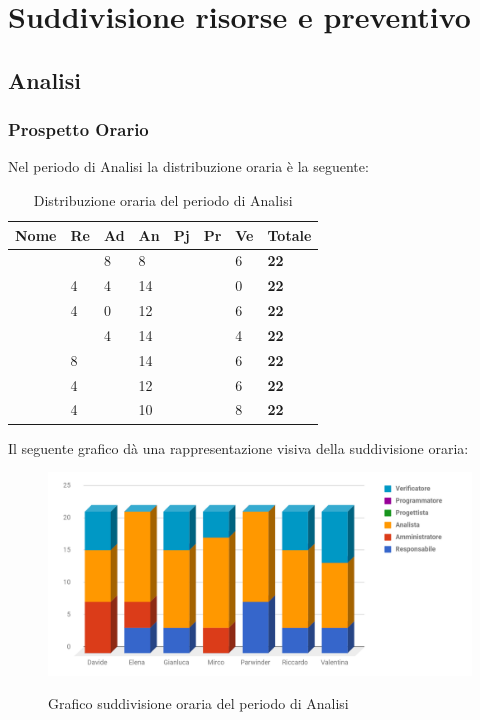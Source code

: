 \documentclass[PianoDiProgetto.tex]{subfiles}
\begin{document}
\chapter{Suddivisione risorse e preventivo}
\section{Analisi}
\subsection{Prospetto Orario}
Nel periodo di Analisi la distribuzione oraria è la seguente:
\begin{center}
\begin{table}[htbp]
	\centering
	\renewcommand\arraystretch{1.5}
	\begin{tabularx}{\textwidth}{p{4cm}|p{1cm}|p{1cm}|p{1cm}|p{1cm}|p{1cm}|p{1cm}|p{2cm}}
		\hline
		\textbf{Nome} & \textbf{Re} & \textbf{Ad} & \textbf{An} & \textbf{Pj} & \textbf{Pr} & \textbf{Ve} & \textbf{Totale} \\
		\hline
		\Davide & \ & 8 & 8 & \ & \ & 6 & \textbf{22} \\
		\hline
		\Elena & 4 & 4 & 14 & \ & \ & 0 & \textbf{22} \\
		\hline
		\Gianluca & 4 & 0 & 12 & \ & \ & 6 & \textbf{22} \\
		\hline
		\Mirco & \ & 4 & 14 & \ & \ & 4 & \textbf{22} \\
		\hline
		\Parwinder & 8 & \ & 14 & \ & \ & 6 & \textbf{22} \\
		\hline
		\Riccardo & 4 & \ & 12 & \ & \ & 6 & \textbf{22} \\
		\hline
		\Valentina & 4 & \ & 10 & \ & \ & 8 & \textbf{22} \\
		\hline
	\end{tabularx}
	\caption{Distribuzione oraria del periodo di Analisi}
	\label{my-label}
\end{table} 
\newpage	
\end{center}
Il seguente grafico dà una rappresentazione visiva della suddivisione oraria:
\begin{figure}[h]
	\includegraphics[width=14.5cm]{images/prospettoOrario/analisi.png}
	\label{fig:foo}
	\caption{Grafico suddivisione oraria del periodo di Analisi}
\end{figure} 
\end{document}
